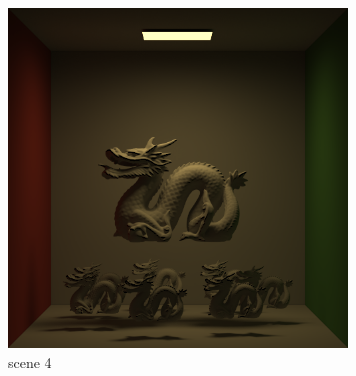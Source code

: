 \documentclass[acmtog]{acmart}
\begin{document}
	\begin{figure}[h]
		\centering
		\includegraphics[height =9cm]{output_4_4096.png}
		\caption{scene 4}
	\end{figure}
\end{document}
